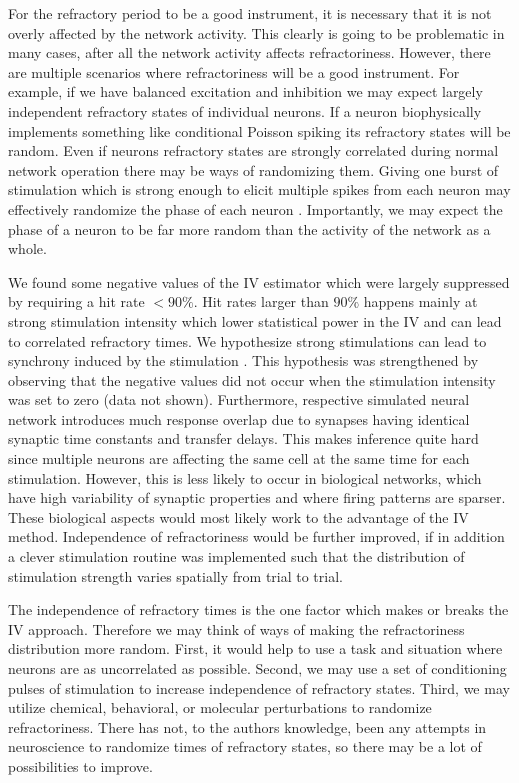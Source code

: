 \documentclass[11pt]{article}
\begin{document}
For the refractory period to be a good instrument, it is necessary that it is not overly affected by the network activity. This clearly is going to be problematic in many cases, after all the network activity affects refractoriness. However, there are multiple scenarios where refractoriness will be a good instrument. For example, if we have balanced excitation and inhibition we may expect largely independent refractory states of individual neurons. If a neuron biophysically implements something like conditional Poisson spiking its refractory states will be random. Even if neurons refractory states are strongly correlated during normal network operation there may be ways of randomizing them. Giving one burst of stimulation which is strong enough to elicit multiple spikes from each neuron may effectively randomize the phase of each neuron \citep{ermentrout2008reliability}. Importantly, we may expect the phase of a neuron to be far more random than the activity of the network as a whole.

We found some negative values of the IV estimator which were largely suppressed by requiring a hit rate $ < 90\%$. Hit rates larger than $90\%$ happens mainly at strong stimulation intensity which lower statistical power in the IV and can lead to correlated refractory times. We hypothesize strong stimulations can lead to synchrony induced by the stimulation \citep{ermentrout2008reliability}. This hypothesis was strengthened by observing that the negative values did not occur when the stimulation intensity was set to zero (data not shown). Furthermore, respective simulated neural network introduces much response overlap due to synapses having identical synaptic time constants and transfer delays. This makes inference quite hard since multiple neurons are affecting the same cell at the same time for each stimulation.  However, this is less likely to occur in biological networks, which have high variability of synaptic properties and where firing patterns are sparser. These biological aspects would most likely work to the advantage of the IV method. Independence of refractoriness would be further improved, if in addition a clever stimulation routine was implemented such that the distribution of stimulation strength varies spatially from trial to trial.

The independence of refractory times is the one factor which makes or breaks the IV approach. Therefore we may think of ways of making the refractoriness distribution more random. First, it would help to use a task and situation where neurons are as uncorrelated as possible. Second, we may use a set of conditioning pulses of stimulation to increase independence of refractory states. Third, we may utilize chemical, behavioral, or molecular perturbations to randomize refractoriness. There has not, to the authors knowledge, been any attempts in neuroscience to randomize times of refractory states, so there may be a lot of possibilities to improve.
\end{document}
